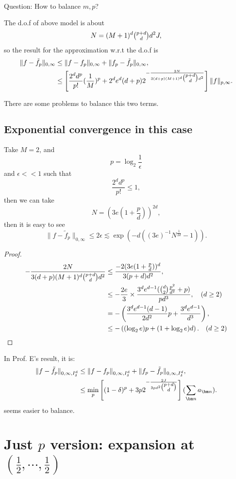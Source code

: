 Question: How to balance $m,p$? 

The d.o.f of above model is about 
$$
N = (M+1)^d \tbinom{p+d}{d} d^2 J,
$$
so the result for the approximation w.r.t the d.o.f is
\begin{align}
\|f- \tilde f_p\|_{0,\infty} &\le \|f - f_p\|_{0,\infty} + \|f_p - \tilde f_p\|_{0,\infty}, \\
&\le \left[ \frac{2^dd^p}{p!}(\frac{1}{M})^p + 2^d e^d (d+p) 2^{-\frac{2N}{3(d+p)(M+1)^d \tbinom{p+d}{d}d^2}}\right] \|f\|_{p, \infty}.
\end{align}

There are some problems to balance this two terms.

\subsection{Exponential convergence in this case}
Take $M = 2$, and 
$$
p = \log_2\frac{1}{\epsilon}
$$
and $\epsilon << 1$ such that 
$$
\frac{2^dd^p}{p!} \le 1,
$$
then we can take 
$$
N = \left( 3e(1 + \frac{p}{d})\right)^{2d},
$$
then it is easy to see
$$
\|f- \tilde f_p\|_{0,\infty} \le 2\epsilon \lesssim \exp({ -d((3e)^{-1}N^{\frac{1}{2d}} - 1)}).
$$
\begin{proof}\label{proof:1}
\begin{align}
-\frac{2N}{3(d+p)(M+1)^d \tbinom{p+d}{d}d^2} &\le\frac{-2(3e(1+\frac{p}{d}))^d}{3(p+d)d^2}, \\
&\le -\frac{2e}{3}\times \frac{3^d e^{d-1}(\tbinom{d}{2}\frac{p^2}{d^2} + p)}{pd^3}, \quad (d \ge 2) \\
&= -\left( \frac{3^de^{d-1}(d-1)}{2d^2}p + \frac{3^de^{d-1}}{d^3} \right), \\
&\le - \left((\log_2{e}) p + (1+\log_2e)d\right). \quad (d \ge 2)
\end{align}
\end{proof}

\begin{remark}
	In Prof. E's result, it is:
	\begin{align}
	\|f- \tilde f_p\|_{0,\infty, I_\delta^d} &\le \|f - f_p\|_{0,\infty, I_\delta^d} + \|f_p - \tilde f_p\|_{0,\infty, I_\delta^d}, \\
	&\le \min_{p} \left[(1-\delta)^p + 3p2^{-\frac{2J}{3pd^2\tbinom{p+d}{d}}}\right] (\sum_{\bm n}a_{\bm n}).
	\end{align}
	seems easier to balance.
	\end{remark}

\section{Just $p$ version: expansion at $ (\frac{1}{2}, \cdots, \frac{1}{2})$}

